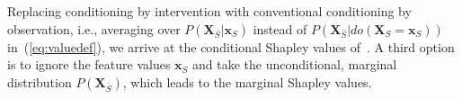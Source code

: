 \documentclass{article}
\newcommand{\vX}{\mathbf{X}}
\newcommand{\vx}{\mathbf{x}}
\newcommand{\expectation}{\mathbb{E}}
\newcommand{\dodo}{\mathit{do}}
\newcommand{\lvdo}[1]{\dodo(\vX_{#1} = \vx_{#1})}
\newcommand{\comment}[1]{{\color{red} #1}}
\begin{document}
Replacing conditioning by intervention with conventional conditioning by observation, i.e., averaging over $P(\vX_{\bar{S}}|\vx_{S})$ instead of $P(\vX_{\bar{S}}|\lvdo{S})$ in~(\ref{eq:valuedef}), we arrive at the conditional Shapley values of~\cite{aas2019explaining,lundberg2018consistent}. A third option is to ignore the feature values $\vx_S$ and take the unconditional, marginal distribution $P(\vX_{\bar{S}})$, which leads to the marginal Shapley values.

\end{document}
